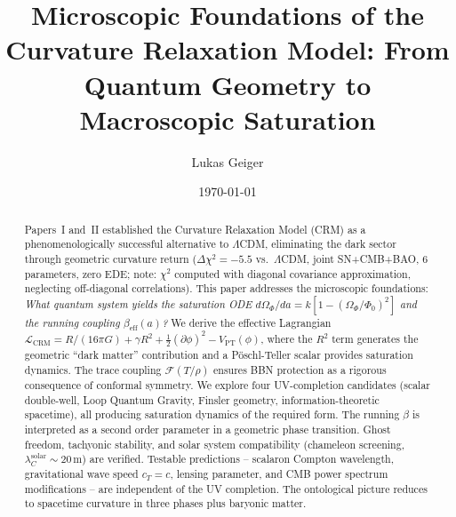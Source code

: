 \documentclass[aps,prd,twocolumn,superscriptaddress,nofootinbib]{revtex4-2}
\begin{document}

\title{Microscopic Foundations of the Curvature Relaxation Model: From Quantum Geometry to Macroscopic Saturation}

\author{Lukas Geiger}

\date{\today}

\begin{abstract}
Papers~I and~II established the Curvature Relaxation Model (CRM) as a phenomenologically successful alternative to $\Lambda$CDM, eliminating the dark sector through geometric curvature return ($\Delta\chi^2 = -5.5$ vs.\ $\Lambda$CDM, joint SN+CMB+BAO, 6 parameters, zero EDE; note: $\chi^2$ computed with diagonal covariance approximation, neglecting off-diagonal correlations). This paper addresses the microscopic foundations: \textit{What quantum system yields the saturation ODE $d\Omega_\Phi/da = k[1-(\Omega_\Phi/\Phi_0)^2]$ and the running coupling $\beta_{\mathrm{eff}}(a)$?} We derive the effective Lagrangian $\mathcal{L}_{\mathrm{CRM}} = R/(16\pi G) + \gamma R^2 + \frac{1}{2}(\partial\phi)^2 - V_{\mathrm{PT}}(\phi)$, where the $R^2$ term generates the geometric ``dark matter'' contribution and a P\"oschl-Teller scalar provides saturation dynamics. The trace coupling $\mathcal{F}(T/\rho)$ ensures BBN protection as a rigorous consequence of conformal symmetry. We explore four UV-completion candidates (scalar double-well, Loop Quantum Gravity, Finsler geometry, information-theoretic spacetime), all producing saturation dynamics of the required form. The running $\beta$ is interpreted as a second order parameter in a geometric phase transition. Ghost freedom, tachyonic stability, and solar system compatibility (chameleon screening, $\lambda_C^{\mathrm{solar}} \sim 20$\,m) are verified. Testable predictions -- scalaron Compton wavelength, gravitational wave speed $c_T = c$, lensing parameter, and CMB power spectrum modifications -- are independent of the UV completion. The ontological picture reduces to spacetime curvature in three phases plus baryonic matter.
\end{abstract}

\end{document}
